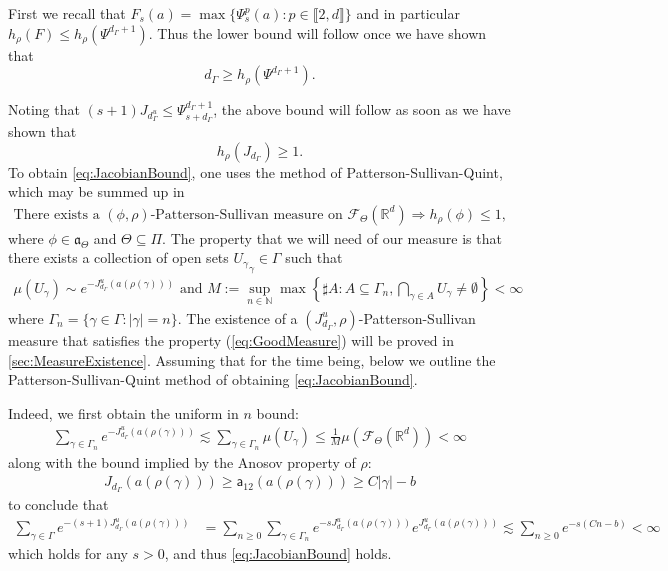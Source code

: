 \documentclass{report}
\begin{document}
First we recall that $F_s(a) = \max \{ \Psi_s^p(a) : p \in \llbracket 2, d \rrbracket\}$ and in particular $h_\rho(F) \leq h_\rho(\Psi^{d_\Gamma + 1})$.
Thus the lower bound will follow once we have shown that
$$d_\Gamma \geq h_\rho(\Psi^{d_\Gamma + 1}).$$

Noting that $(s+1) J_{d_\Gamma^u} \leq \Psi_{s+d_\Gamma}^{d_\Gamma + 1}$, the above bound will follow as soon as we have shown that
\begin{equation}\label{eq:JacobianBound}
    h_\rho(J_{d_\Gamma}) \geq 1.\tag{LB}
\end{equation}
To obtain \cref{eq:JacobianBound}, one uses the method of Patterson-Sullivan-Quint, which may be summed up in
\begin{align*}
    \text{There exists a } (\phi, \rho)\text{-Patterson-Sullivan measure on } \mathcal F_\Theta(\mathbb R^d) 
    \Rightarrow h_\rho(\phi) \leq 1,
\end{align*}
where $\phi \in \mathfrak a_\Theta$ and $ \Theta \subseteq \Pi$.
The property that we will need of our measure is that there exists a collection of open sets ${U_\gamma}_\gamma \in \Gamma$ such that
\begin{align*}\label{eq:GoodMeasure}
    \mu(U_\gamma) \sim e^{-J_{d_\Gamma}^u(a(\rho(\gamma)))} \text{ and } 
    M := \sup_{n \in \mathbb N}
    \max
    \left\{\sharp A : A \subseteq \Gamma_n,  \bigcap_{\gamma \in A}U_\gamma \neq \emptyset \right\} < \infty\tag{MP}
\end{align*}
where $\Gamma_n = \{ \gamma \in \Gamma : |\gamma| = n \} $.
The existence of a $(J_{d_\Gamma}^u, \rho)$-Patterson-Sullivan measure that satisfies the property (\ref{eq:GoodMeasure}) will be proved in \cref{sec:MeasureExistence}.
Assuming that for the time being, below we outline the Patterson-Sullivan-Quint method of obtaining \cref{eq:JacobianBound}.

Indeed, we first obtain the uniform in $n$ bound:
\begin{align*}
    \sum_{\gamma \in \Gamma_n}
    e^{-J_{d_\Gamma}^u(a(\rho(\gamma)))} \lesssim
    \sum_{\gamma \in \Gamma_n}
    \mu(U_\gamma) \leq \frac{1}{M} \mu(\mathcal F_\Theta(\mathbb R^d)) < \infty
\end{align*}
along with the bound implied by the Anosov property of $\rho$:
\begin{align*}
J_{d_\Gamma}(a(\rho(\gamma))) \geq \mathsf a_{12} (a(\rho(\gamma))) \geq C|\gamma| - b
\end{align*}
to conclude that
\begin{align*}
\sum_{\gamma \in \Gamma} e^{-(s+1)J^u_{d_\Gamma}(a(\rho(\gamma)))} &=
\sum_{n\geq 0} \sum_{\gamma \in \Gamma_n} e^{-s J^u_{d_\Gamma}(a(\rho(\gamma)))}
    e^{J^u_{d_\Gamma}(a(\rho(\gamma)))} \lesssim
\sum_{n\geq 0} e^{-s(Cn - b)} < \infty
\end{align*}
which holds for any $s>0$, and thus \cref{eq:JacobianBound} holds.
\end{document}
